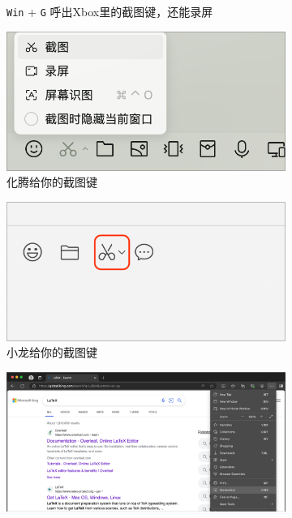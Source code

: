 \documentclass[11pt, fontset = fandol, dvipdfmx]{ctexart}
\newcommand*\sh \texttt
\begin{document}
\begin{figure}[htbp]
\begin{subfigure}{.48\linewidth}
    \caption{\sh{Win} + \sh{G} 呼出Xbox里的截图键，还能录屏}
  \end{subfigure}
  \begin{subfigure}{.48\linewidth}
    \centering
    \includegraphics[width = .96\linewidth]{QQ}
    \caption{化腾给你的截图键}
  \end{subfigure}
  \hspace*{\fill}
  \begin{subfigure}{.48\linewidth}
    \centering
    \includegraphics[width = .96\linewidth]{WeChat}
    \caption{小龙给你的截图键}
  \end{subfigure}
  \begin{subfigure}{.48\linewidth}
    \centering
    \includegraphics[width = .96\linewidth]{Edge}

\end{subfigure}
\end{figure}
\end{document}
